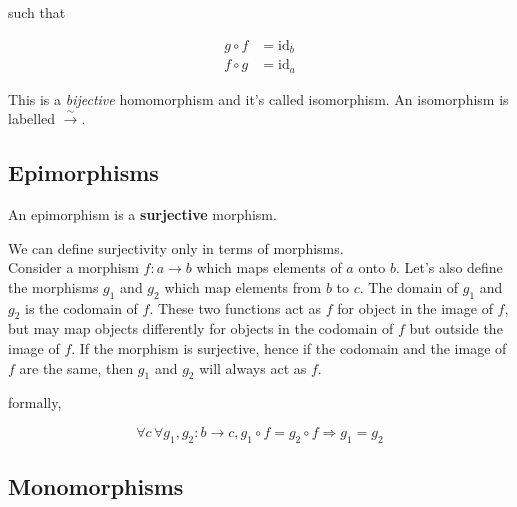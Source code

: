 \documentclass{article}
\begin{document}
such that

\begin{align*}
    g \circ f &= \text{id}_b
    \\
    f \circ g &= \text{id}_a
\end{align*}

\begin{center}
\end{center}

This is a \textit{bijective} homomorphism and it's called isomorphism.
An isomorphism is labelled \(\xrightarrow{\sim}\).

\subsection{Epimorphisms}

An epimorphism is a \textbf{surjective} morphism.

We can define surjectivity only in terms of morphisms.
\\
Consider a morphism \(f: a \rightarrow b\) which maps elements of \(a\) onto \(b\).
Let's also define the morphisms \(g_1\) and \(g_2\) which map elements from \(b\) to \(c\).
The domain of \(g_1\) and \(g_2\) is the codomain of \(f\). These two functions act
as \(f\) for object in the image of \(f\), but may map objects differently
for objects in the codomain of \(f\) but outside the image of \(f\).
If the morphism is surjective, hence if the codomain and the image of \(f\) are the same,
then \(g_1\) and \(g_2\) will always act as \(f\).

\begin{center}
\end{center}

formally,

\[
    \forall c\, \forall g_1, g_2 : b \rightarrow c, g_1 \circ f = g_2 \circ f \Rightarrow g_1 = g_2
\]


\subsection{Monomorphisms}

\end{document}
